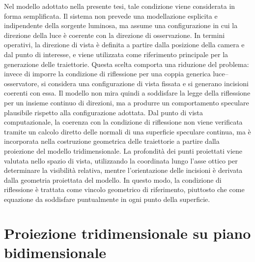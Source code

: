 \documentclass[a4paper,11pt,titlepage,twoside]{book}
\newcommand{\1}{\mathbf{1}}
\numberwithin{equation}{chapter}
\theoremstyle{plain}
\theoremstyle{definition}
\begin{document}
	Nel modello adottato nella presente tesi, tale condizione viene considerata in forma semplificata. Il sistema non prevede una modellazione esplicita e indipendente della sorgente luminosa, ma assume una configurazione in cui la direzione della luce è coerente con la direzione di osservazione. In termini operativi, la direzione di vista è definita a partire dalla posizione della camera e dal punto di interesse, e viene utilizzata come riferimento principale per la generazione delle traiettorie.
	Questa scelta comporta una riduzione del problema: invece di imporre la condizione di riflessione per una coppia generica luce–osservatore, si considera una configurazione di vista fissata e si generano incisioni coerenti con essa. Il modello non mira quindi a soddisfare la legge della riflessione per un insieme continuo di direzioni, ma a produrre un comportamento speculare plausibile rispetto alla configurazione adottata.
	Dal punto di vista computazionale, la coerenza con la condizione di riflessione non viene verificata tramite un calcolo diretto delle normali di una superficie speculare continua, ma è incorporata nella costruzione geometrica delle traiettorie a partire dalla proiezione del modello tridimensionale. La profondità dei punti proiettati viene valutata nello spazio di vista, utilizzando la coordinata lungo l’asse ottico per determinare la visibilità relativa, mentre l’orientazione delle incisioni è derivata dalla geometria proiettata del modello. In questo modo, la condizione di riflessione è trattata come vincolo geometrico di riferimento, piuttosto che come equazione da soddisfare puntualmente in ogni punto della superficie.
	
	\section{Proiezione tridimensionale su piano bidimensionale}
	
\end{document}
